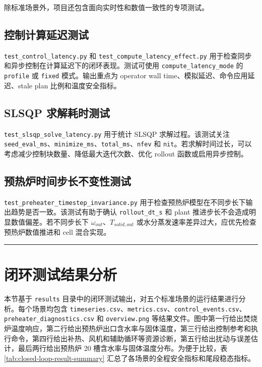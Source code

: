 \documentclass[UTF8,openany,zihao=-4,oneside]{ctexbook}
\providecommand{\passthrough}[1]{#1}
\newcommand{\manualdivider}{\par\vspace{0.6em}\noindent\textcolor{FGLine}{\rule{\linewidth}{0.7pt}}\vspace{0.6em}\par}
\begin{document}
除标准场景外，项目还包含面向实时性和数值一致性的专项测试。

\subsection{控制计算延迟测试}\label{subsec:test-control-latency}

\passthrough{\lstinline!test_control_latency.py!} 和 \passthrough{\lstinline!test_compute_latency_effect.py!} 用于检查同步和异步控制在计算延迟下的闭环表现。测试可使用 \passthrough{\lstinline!compute_latency_mode!} 的 \passthrough{\lstinline!profile!} 或 \passthrough{\lstinline!fixed!} 模式。输出重点为 operator wall time、模拟延迟、命令应用延迟、stale plan 比例和温度安全指标。

\subsection{SLSQP 求解耗时测试}\label{subsec:test-slsqp-latency}

\passthrough{\lstinline!test_slsqp_solve_latency.py!} 用于统计 SLSQP 求解过程。该测试关注 \passthrough{\lstinline!seed_eval_ms!}、\passthrough{\lstinline!minimize_ms!}、\passthrough{\lstinline!total_ms!}、\passthrough{\lstinline!nfev!} 和 \passthrough{\lstinline!nit!}。若求解时间过长，可以考虑减少控制块数量、降低最大迭代次数、优化 rollout 函数或启用异步控制。

\subsection{预热炉时间步长不变性测试}\label{subsec:test-timestep-invariance}

\passthrough{\lstinline!test_preheater_timestep_invariance.py!} 用于检查预热炉模型在不同步长下输出趋势是否一致。该测试有助于确认 \passthrough{\lstinline!rollout_dt_s!} 和 plant 推进步长不会造成明显数值偏差。若不同步长下 \(\omega_{out}\)、\(T_{solid,out}\) 或水分蒸发速率差异过大，应优先检查预热炉数值推进和 cell 混合实现。

\manualdivider

\section{闭环测试结果分析}\label{sec:test-result-analysis}

本节基于 \passthrough{\lstinline!results!} 目录中的闭环测试输出，对五个标准场景的运行结果进行分析。每个场景均包含 \passthrough{\lstinline!timeseries.csv!}、\passthrough{\lstinline!metrics.csv!}、\passthrough{\lstinline!control_events.csv!}、\passthrough{\lstinline!preheater_diagnostics.csv!} 和 \passthrough{\lstinline!overview.png!} 等结果文件。图中第一行给出焚烧炉温度响应，第二行给出预热炉出口含水率与固体温度，第三行给出控制参考和执行命令，第四行给出补热、风机和辅助循环等资源诊断，第五行给出扰动与误差估计，最后两行给出预热炉 20 槽含水率与固体温度分布。为便于比较，表 \ref{tab:closed-loop-result-summary} 汇总了各场景的全程安全指标和尾段稳态指标。
\end{document}
